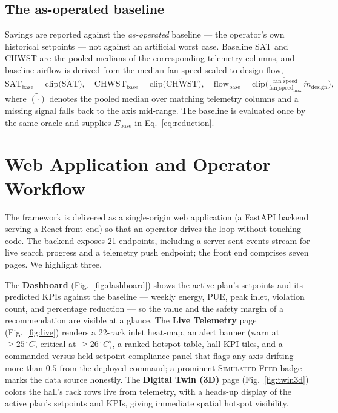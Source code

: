 \documentclass[11pt]{article}
\newcommand{\degC}{\ensuremath{^{\circ}}C}
\begin{document}
\subsection{The as-operated baseline}
\label{sec:baseline}
Savings are reported against the \emph{as-operated} baseline --- the operator's own
historical setpoints --- not against an artificial worst case. Baseline SAT and CHWST are
the pooled medians of the corresponding telemetry columns, and baseline airflow is derived
from the median fan speed scaled to design flow,
\begin{equation}
\mathrm{SAT}_{\mathrm{base}} = \mathrm{clip}\big(\widetilde{\mathrm{SAT}}\big),\quad
\mathrm{CHWST}_{\mathrm{base}} = \mathrm{clip}\big(\widetilde{\mathrm{CHWST}}\big),\quad
\mathrm{flow}_{\mathrm{base}} = \mathrm{clip}\!\Big(\tfrac{\widetilde{\mathrm{fan\_speed}}}{\mathrm{fan\_speed}_{\max}}\,\dot m_{\mathrm{design}}\Big),
\label{eq:baseline}
\end{equation}
where \(\widetilde{(\cdot)}\) denotes the pooled median over matching telemetry columns and a
missing signal falls back to the axis mid-range. The baseline is evaluated once by the same
oracle and supplies \(E_{\mathrm{base}}\) in Eq.~\eqref{eq:reduction}.

\section{Web Application and Operator Workflow}
\label{sec:webapp}

The framework is delivered as a single-origin web application (a FastAPI backend serving a
React front end) so that an operator drives the loop without touching code. The backend
exposes 21 endpoints, including a server-sent-events stream for live search progress and a
telemetry push endpoint; the front end comprises seven pages. We highlight three.

The \textbf{Dashboard} (Fig.~\ref{fig:dashboard}) shows the active plan's setpoints and its
predicted KPIs against the baseline --- weekly energy, PUE, peak inlet, violation count, and
percentage reduction --- so the value and the safety margin of a recommendation are visible
at a glance. The \textbf{Live Telemetry} page (Fig.~\ref{fig:live}) renders a 22-rack inlet
heat-map, an alert banner (warn at \(\ge25\,\degC\), critical at \(\ge26\,\degC\)), a ranked
hotspot table, hall KPI tiles, and a commanded-versus-held setpoint-compliance panel that
flags any axis drifting more than \(0.5\) from the deployed command; a prominent
\textsc{Simulated Feed} badge marks the data source honestly. The \textbf{Digital Twin (3D)}
page (Fig.~\ref{fig:twin3d}) colors the hall's rack rows live from telemetry, with a heads-up
display of the active plan's setpoints and KPIs, giving immediate spatial hotspot visibility.
\end{document}
